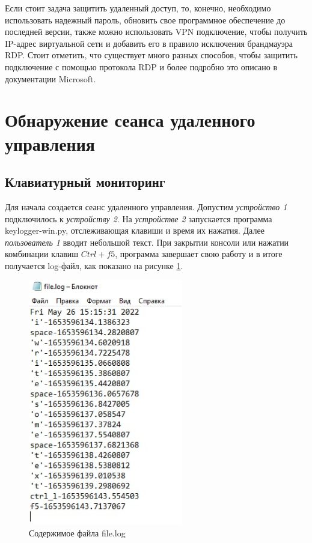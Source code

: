 \documentclass[bachelor, och, coursework]{SCWorks}
\begin{document}
  Если стоит задача защитить удаленный доступ, то, конечно, необходимо использовать надежный пароль, обновить свое программное обеспечение до последней версии,
  также можно использовать VPN подключение, чтобы получить IP-адрес виртуальной сети и добавить его в правило исключения брандмауэра RDP. Стоит отметить, что
  существует много разных способов, чтобы защитить подключение с помощью протокола RDP и более подробно это описано в документации Microsoft.
  
  \section{Обнаружение сеанса удаленного управления}

  \subsection{Клавиатурный мониторинг}

  Для начала создается сеанс удаленного управления. Допустим \textit{устройство 1} подключилось к \textit{устройству 2}. На \textit{устройстве 2} запускается программа
  keylogger-win.py, отслеживающая клавиши и время их нажатия. Далее \textit{пользователь 1} вводит небольшой текст. При закрытии консоли или нажатии комбинации клавиш
  $Ctrl + f5$, программа завершает свою работу и в итоге получается log-файл, как показано на рисунке \ref{r1}. 
  
  
  \begin{figure}[H]
    \centering
    \includegraphics[width=0.6\textwidth]{photo/kl1.png}
    \caption{Содержимое файла file.log}
    \label{r1}
  \end{figure}
\end{document}
